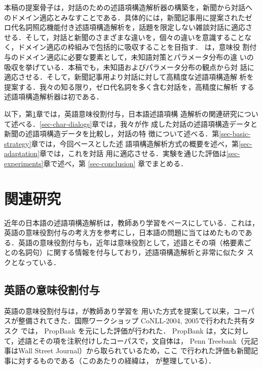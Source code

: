 \documentclass[japanese]{jnlp_1.4}
\begin{document}
本稿の提案骨子は，対話のための述語項構造解析器の構築を，新聞から対話へ
のドメイン適応とみなすことである．具体的には，新聞記事用に提案されたゼ
ロ代名詞照応機能付き述語項構造解析を，話題を限定しない雑談対話に適応さ
せる．そして，対話と新聞のさまざまな違いを，個々の違いを意識することな
く，ドメイン適応の枠組みで包括的に吸収することを目指す．
は，意味役
割付与のドメイン適応に必要な要素として，未知語対策とパラメータ分布の違
いの吸収を挙げている．本稿でも，未知語およびパラメータ分布の観点から対
話に適応させる．そして，新聞記事用より対話に対して高精度な述語項構造解
析を提案する．我々の知る限り，ゼロ代名詞を多く含む対話を，高精度に解析
する述語項構造解析器は初である．

以下，第\ref{sec-related-work}章では，英語意味役割付与，日本語述語項構
造解析の関連研究について述べる．\ref{sec-char-dialogs}章では，我々が作
成した対話の述語項構造データと新聞の述語項構造データを比較し，対話の特
徴について述べる．第\ref{sec-basic-strategy}章では，今回ベースとした述
語項構造解析方式の概要を述べ，第\ref{sec-adaptation}章では，これを対話
用に適応させる．実験を通じた評価は\ref{sec-experiments}章で述べ，第
\ref{sec-conclusion} 章でまとめる．


\section{関連研究}
\label{sec-related-work}

近年の日本語の述語項構造解析は，教師あり学習をベースにしている．これは，
英語の意味役割付与の考え方を参考にし，日本語の問題に当てはめたものであ
る．英語の意味役割付与も，近年は意味役割として，述語とその項（格要素ご
との名詞句）に関する情報を付与しており，述語項構造解析と非常に似たタ
スクとなっている．

\subsection{英語の意味役割付与}

英語の意味役割付与は，が教師あり学習を
用いた方式を提案して以来，コーパスが整備されてきた．国際ワークショップ
CoNLL-2004, 2005で行われた共有タスク
\cite{carreras-marquez:2004:CONLL,carreras-marquez:2005:CoNLL}では，
PropBank \cite{Palmer:PropBank2005}を元にした評価が行われた．
PropBank は，文に対して，述語とその項を注釈付けしたコーパスで，文自体は，
Penn Treebank（元記事はWall Street Journal）から取られているため，ここ
で行われた評価も新聞記事に対するものである（このあたりの経緯は，
が整理している）．
\end{document}
